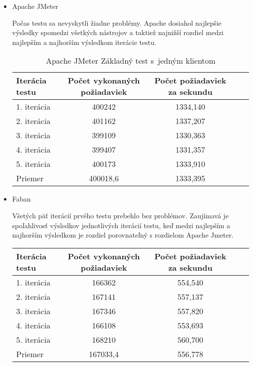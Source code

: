 \documentclass[12pt,oneside,final]{fithesis-utf8}
\begin{document}
\begin{itemize}

\item Apache JMeter

Počas testu sa nevyskytli žiadne problémy. Apache dosiahol najlepšie výsledky spomedzi všetkých nástrojov a taktiež najnižší rozdiel medzi najlepším a najhorším výsledkom iterácie testu.

\begin{table}[H]
\begin{center}
\begin{tabular}{ | l | c | c | c | c |}
		\hline
		 \textbf{Iterácia testu} & \textbf{Počet vykonaných požiadaviek} & \textbf{Počet požiadaviek za sekundu} \\ \hline
		 1. iterácia & 400242 & 1334,140 \\ \hline
		 2. iterácia & 401162 & 1337,207 \\ \hline
		 3. iterácia & 399109 & 1330,363 \\ \hline
		 4. iterácia & 399407 & 1331,357 \\ \hline
		 5. iterácia & 400173 & 1333,910 \\ \hline
		 Priemer & 400018,6 & 1333,395 \\ \hline
		 
\end{tabular}
\end{center}
\caption{Apache JMeter Základný test s~jedným klientom}
\end{table}

\item Faban

Všetých päť iterácií prvého testu prebehlo bez problémov. Zaujímavá je spoľahlivosť výsledkov jednotlivých iterácií testu, keď medzi najlepším a najhorším výsledkom je rozdiel porovnateľný s rozdielom Apache Jmeter.

\begin{table}[H]
\begin{center}
\begin{tabular}{ | l | c | c | c | c |}
		\hline
		 \textbf{Iterácia testu} & \textbf{Počet vykonaných požiadaviek} & \textbf{Počet požiadaviek za sekundu} \\ \hline
		 1. iterácia & 166362 & 554,540 \\ \hline
		 2. iterácia & 167141 & 557,137 \\ \hline
		 3. iterácia & 167346 & 557,820 \\ \hline
		 4. iterácia & 166108 & 553,693 \\ \hline
		 5. iterácia & 168210 & 560,700 \\ \hline
		 Priemer & 167033,4 & 556,778 \\ \hline
		 

\end{tabular}
\end{center}
\end{table}
\end{itemize}
\end{document}
